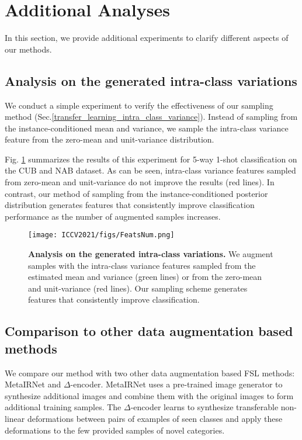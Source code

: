 \documentclass[10pt,twocolumn,letterpaper]{article}
\begin{document}
 \section{Additional Analyses}
 In this section, we provide additional experiments to clarify different aspects of our methods. 
  \subsection{Analysis on the generated intra-class variations}
  \label{sec:generated Intra-class Variance}
  
    
   
We conduct a simple experiment to verify the effectiveness of our sampling method (Sec.\ref{transfer_learning_intra_class_variance}). Instead of sampling from the instance-conditioned mean and variance, we sample the intra-class variance feature from the zero-mean and unit-variance distribution.  
   
   Fig. \ref{fig:feats_num} summarizes the results of this experiment for 5-way 1-shot classification on the CUB and NAB dataset. As can be seen, intra-class variance features sampled from zero-mean and unit-variance do not improve the results (red lines). In contrast, our method of sampling from the instance-conditioned posterior distribution generates features that consistently improve  classification performance as the number of augmented samples increases. 

   


  
   


  \begin{figure}[!htb]
  \centering
  \texttt{[image: ICCV2021/figs/FeatsNum.png]}
  \caption{
  \textbf{Analysis on the generated intra-class variations.}  We augment samples with the intra-class variance features sampled from the estimated mean and variance (green lines) or from the zero-mean and unit-variance (red lines). Our sampling scheme generates features that consistently improve  classification. 
}\label{fig:feats_num}
\end{figure}



\subsection{Comparison to other data augmentation based methods}
  
  We  compare our method with two other data augmentation based FSL methods: MetaIRNet\cite{metair_gan} and $\Delta$-encoder\cite{delta-encoder}.
MetaIRNet uses a pre-trained image generator to synthesize additional images and combine them with the original images to form additional training samples. The $\Delta$-encoder learns to synthesize transferable non-linear deformations between pairs of examples of seen classes 
  and apply these deformations to the few provided samples of novel categories.
\end{document}
